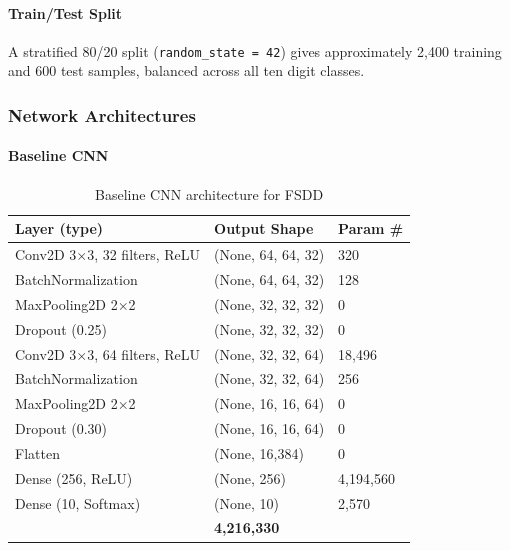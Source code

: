 \paragraph{Train/Test Split}

A stratified 80/20 split (\texttt{random\_state = 42}) gives approximately
2,400 training and 600 test samples, balanced across all ten digit classes.

\subsubsection{Network Architectures}

\paragraph{Baseline CNN}

\begin{table}[H]
\centering
\caption{Baseline CNN architecture for FSDD}
\label{tab:b_baseline_arch}
\begin{tabular}{L{5cm} C{3.5cm} C{2.5cm}}
\toprule
{}
\textbf{Layer (type)} & \textbf{Output Shape} & \textbf{Param \#} \\
\midrule
Conv2D 3$\times$3, 32 filters, ReLU & (None, 64, 64, 32) & 320 \\
BatchNormalization                   & (None, 64, 64, 32) & 128 \\
MaxPooling2D 2$\times$2              & (None, 32, 32, 32) & 0 \\
Dropout (0.25)                       & (None, 32, 32, 32) & 0 \\
Conv2D 3$\times$3, 64 filters, ReLU & (None, 32, 32, 64) & 18,496 \\
BatchNormalization                   & (None, 32, 32, 64) & 256 \\
MaxPooling2D 2$\times$2              & (None, 16, 16, 64) & 0 \\
Dropout (0.30)                       & (None, 16, 16, 64) & 0 \\
Flatten                              & (None, 16,384)      & 0 \\
Dense (256, ReLU)                    & (None, 256)         & 4,194,560 \\
Dense (10, Softmax)                  & (None, 10)          & 2,570 \\
\midrule
{}
 & \textbf{4,216,330} \\
\bottomrule
\end{tabular}
\end{table}

